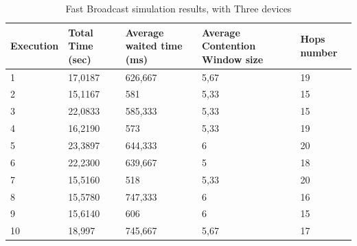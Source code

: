 \begin{table}
\caption{Fast Broadcast simulation results, with Three devices}
\label{tab:Android_res}
\centering
\begin{tabular}{|m{}|m{}|m{}|m{}|m{}|}
\hline
Execution & Total \newline Time (sec) & Average waited time (ms) & Average Contention Window size & Hops \newline number \\
\hline
1 & 17,0187 & 626,667 & 5,67 & 19 \\
\hline
2 & 15,1167 & 581	  & 5,33 & 15 \\
\hline
3 & 22,0833 & 585,333 & 5,33 & 15 \\
\hline
4 & 16,2190 & 573	  & 5,33 & 19 \\
\hline
5 & 23,3897 & 644,333 & 6	 & 20 \\
\hline
6 & 22,2300 & 639,667 & 5	 & 18 \\
\hline
7 & 15,5160 & 518	  & 5,33 & 20 \\
\hline
8 & 15,5780 & 747,333 & 6	 & 16 \\
\hline
9 & 15,6140 & 606     & 6	 & 15 \\
\hline
10 & 18,997 & 745,667 & 5,67 & 17 \\
\hline
\end{tabular}
\end{table}  

